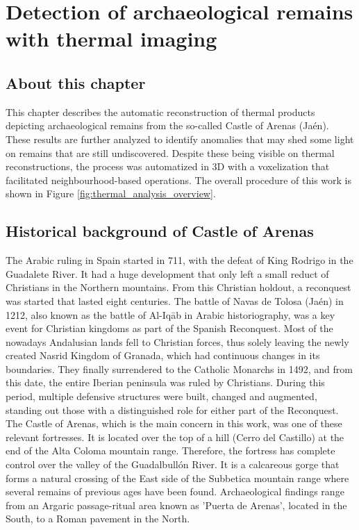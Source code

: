 
\setchapterpreamble[u]{\margintoc}
\chapter{Detection of archaeological remains with thermal imaging}
\label{sec:castle_puerta_arenas}

\section*{About this chapter}

This chapter describes the automatic reconstruction of thermal products depicting archaeological remains from the so-called Castle of Arenas (Jaén). These results are further analyzed to identify anomalies that may shed some light on remains that are still undiscovered. Despite these being visible on thermal reconstructions, the process was automatized in 3D with a voxelization that facilitated neighbourhood-based operations. The overall procedure of this work is shown in Figure \ref{fig:thermal_analysis_overview}.

\section{Historical background of Castle of Arenas}

The Arabic ruling in Spain started in 711, with the defeat of King Rodrigo in the Guadalete River. It had a huge development that only left a small reduct of Christians in the Northern mountains. From this Christian holdout, a reconquest was started that lasted eight centuries. The battle of Navas de Tolosa (Jaén) in 1212, also known as the battle of Al-Iqāb in Arabic historiography, was a key event for Christian kingdoms as part of the Spanish Reconquest. Most of the nowadays Andalusian lands fell to Christian forces, thus solely leaving the newly created Nasrid Kingdom of Granada, which had continuous changes in its boundaries. They finally surrendered to the Catholic Monarchs in 1492, and from this date, the entire Iberian peninsula was ruled by Christians. During this period, multiple defensive structures were built, changed and augmented, standing out those with a distinguished role for either part of the Reconquest. The Castle of Arenas, which is the main concern in this work, was one of these relevant fortresses. It is located over the top of a hill (Cerro del Castillo) at the end of the Alta Coloma mountain range. Therefore, the fortress has complete control over the valley of the Guadalbullón River. It is a calcareous gorge that forms a natural crossing of the East side of the Subbetica mountain range where several remains of previous ages have been found. Archaeological findings range from an Argaric passage-ritual area known as 'Puerta de Arenas', located in the South, to a Roman pavement in the North.

